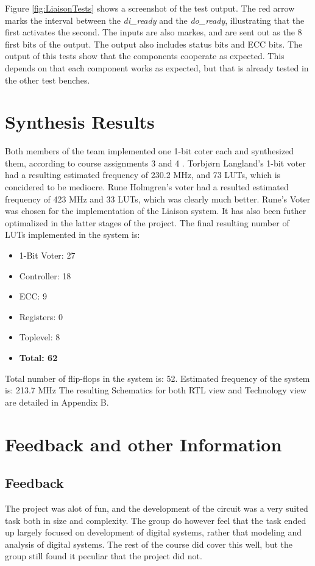 \documentclass[a4paper]{IEEEtran}
\begin{document}
Figure \ref{fig:LiaisonTests} shows a screenshot of the test output.
The red arrow marks the interval between the \textit{di\_ready} and the \textit{do\_ready}, illustrating that the first activates the second.
The inputs are also markes, and are sent out as the 8 first bits of the output.
The output also includes status bits and ECC bits.
The output of this tests show that the components cooperate as expected.
This depends on that each component works as expected, but that is already tested in the other test benches.

\section{Synthesis Results}
Both members of the team implemented one 1-bit coter each and synthesized them, according to course assignments 3 and 4 \protect\cite{assignment-3} \protect\cite{assignment-4}.
Torbjørn Langland's 1-bit voter had a resulting estimated frequency of 230.2 MHz, and 73 LUTs, which is concidered to be mediocre.
Rune Holmgren's voter had a resulted estimated frequency of 423 MHz and 33 LUTs, which was clearly much better.
Rune's Voter was chosen for the implementation of the Liaison system.
It has also been futher optimalized in the latter stages of the project.
The final resulting number of LUTs implemented in the system is:
\begin{itemize}
    \item 1-Bit Voter: 27
    \item Controller: 18
    \item ECC: 9
    \item Registers: 0
    \item Toplevel: 8
    \item \textbf{Total: 62}
\end{itemize}
Total number of flip-flops in the system is: 52.
\break
Estimated frequency of the system is: 213.7 MHz
\break
The resulting Schematics for both RTL view and Technology view are detailed in Appendix B.

\section{Feedback and other Information}
\subsection{Feedback}
The project was alot of fun, and the development of the circuit was a very suited task both in size and complexity.
The group do however feel that the task ended up largely focused on development of digital systems, rather that modeling and analysis of digital systems.
The rest of the course did cover this well, but the group still found it peculiar that the project did not.
\end{document}
